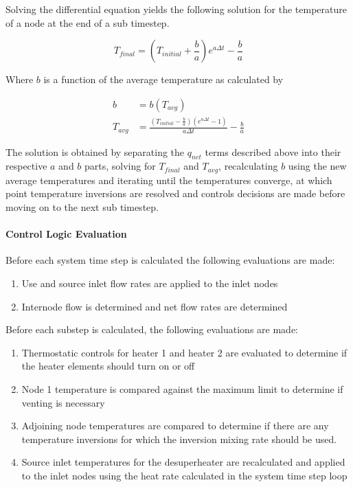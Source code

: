Solving the differential equation yields the following solution for the temperature of a node at the end of a sub timestep. 

\begin{equation}
  T_{final} = \left( T_{initial} + \frac{b}{a} \right) e ^ {a \Delta t} - \frac{b}{a}
\end{equation}

Where $b$ is a function of the average temperature as calculated by

\begin{equation}
  \begin{array}{rl}
    b &= b(T_{avg}) \\
    T_{avg} &= \frac{(T_{initial} - \frac{b}{a}) (e ^ {a \Delta t} - 1)}{a \Delta t} - \frac{b}{a}
  \end{array}
\end{equation}

The solution is obtained by separating the $q_{net}$ terms described above into their respective $a$ and $b$ parts, solving for $T_{final}$ and $T_{avg}$, recalculating $b$ using the new average temperatures and iterating until the temperatures converge, at which point temperature inversions are resolved and controls decisions are made before moving on to the next sub timestep.

\paragraph{Control Logic Evaluation}

Before each system time step is calculated the following evaluations are made:

\begin{enumerate}
\item Use and source inlet flow rates are applied to the inlet nodes
\item Internode flow is determined and net flow rates are determined
\end{enumerate}

Before each substep is calculated, the following evaluations are made:

\begin{enumerate}
\item Thermostatic controls for heater 1 and heater 2 are evaluated to determine if the heater elements should turn on or off
\item Node 1 temperature is compared against the maximum limit to determine if venting is necessary
\item Adjoining node temperatures are compared to determine if there are any temperature inversions for which the inversion mixing rate should be used.
\item Source inlet temperatures for the desuperheater are recalculated and applied to the inlet nodes using the heat rate calculated in the system time step loop
\end{enumerate}

